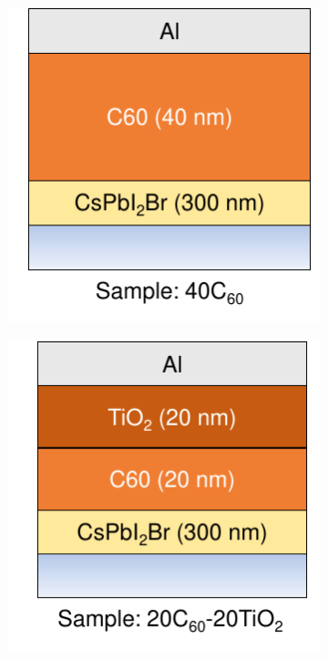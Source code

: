 \begin{figure}[htbp]
\begin{subfigure}{0.24\textwidth}
        \caption{}
        \label{}
    \end{subfigure}
    \hfill
    \begin{subfigure}{0.24\textwidth}
        \centering
        \includegraphics[width=\textwidth]{chapters/transport_layers/images/ETL_Optimization_40C60.pdf}
        \caption{}
        \label{}
    \end{subfigure}
    \hfill
    \begin{subfigure}{0.24\textwidth}
        \centering
        \includegraphics[width=\textwidth]{chapters/transport_layers/images/ETL_Optimization_20_20.pdf}
        \caption{}
        \label{}
    \end{subfigure}
    

\end{figure}

